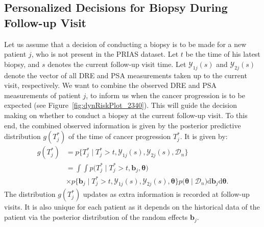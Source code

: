\subsection{Personalized Decisions for Biopsy During Follow-up Visit}
\label{subsec:pers_decision_making}
Let us assume that a decision of conducting a biopsy is to be made for a new patient $j$, who is not present in the PRIAS dataset. Let $t$ be the time of his latest biopsy, and $s$ denotes the current follow-up visit time. Let $\mathcal{Y}_{1j}(s)$ and $\mathcal{Y}_{2j}(s)$ denote the vector of all DRE and PSA measurements taken up to the current visit, respectively. We want to combine the observed DRE and PSA measurements of patient $j$, to inform us when the cancer progression is to be expected (see Figure~\ref{fig:dynRiskPlot_2340}). This will guide the decision making on whether to conduct a biopsy at the current follow-up visit. To this end, the combined observed information is given by the posterior predictive distribution $g(T^*_j)$ of the time of cancer progression $T^*_j$. It is given by:
\begin{equation*}
\label{eq:post_pred_dist}
\begin{aligned}
g(T^*_j) &= p\big\{T^*_j \mid T^*_j > t, \mathcal{Y}_{1j}(s), \mathcal{Y}_{2j}(s), \mathcal{D}_n\big\}\\
&= \int \int p\big(T^*_j \mid T^*_j > t, \boldsymbol{b}_j, \boldsymbol{\theta}\big)\\
&\times p\big\{\boldsymbol{b}_j \mid T^*_j>t, \mathcal{Y}_{1j}(s), \mathcal{Y}_{2j}(s), \boldsymbol{\theta}\big\}p\big(\boldsymbol{\theta} \mid \mathcal{D}_n\big) \mathrm{d} \boldsymbol{b}_j \mathrm{d} \boldsymbol{\theta}.
\end{aligned}
\end{equation*}
The distribution $g(T^*_j)$ updates as extra information is recorded at follow-up visits. It is also unique for each patient as it depends on the historical data of the patient via the posterior distribution of the random effects $\boldsymbol{b}_j$.


